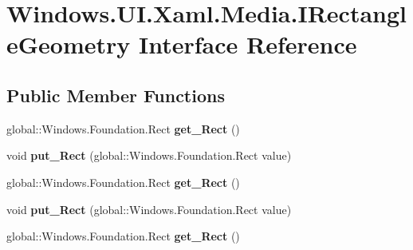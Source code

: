 \hypertarget{interface_windows_1_1_u_i_1_1_xaml_1_1_media_1_1_i_rectangle_geometry}{}\section{Windows.\+U\+I.\+Xaml.\+Media.\+I\+Rectangle\+Geometry Interface Reference}
\label{interface_windows_1_1_u_i_1_1_xaml_1_1_media_1_1_i_rectangle_geometry}
\subsection*{Public Member Functions}
\begin{DoxyCompactItemize}
\item 
\mbox{\label{interface_windows_1_1_u_i_1_1_xaml_1_1_media_1_1_i_rectangle_geometry_a0f7b043b0ee06c706ac2dd2b55e3811c}} 
global\+::\+Windows.\+Foundation.\+Rect {\bfseries get\+\_\+\+Rect} ()
\item 
\mbox{\label{interface_windows_1_1_u_i_1_1_xaml_1_1_media_1_1_i_rectangle_geometry_ad76506b912562159564afd0409fe2572}} 
void {\bfseries put\+\_\+\+Rect} (global\+::\+Windows.\+Foundation.\+Rect value)
\item 
\mbox{\label{interface_windows_1_1_u_i_1_1_xaml_1_1_media_1_1_i_rectangle_geometry_a0f7b043b0ee06c706ac2dd2b55e3811c}} 
global\+::\+Windows.\+Foundation.\+Rect {\bfseries get\+\_\+\+Rect} ()
\item 
\mbox{\label{interface_windows_1_1_u_i_1_1_xaml_1_1_media_1_1_i_rectangle_geometry_ad76506b912562159564afd0409fe2572}} 
void {\bfseries put\+\_\+\+Rect} (global\+::\+Windows.\+Foundation.\+Rect value)
\item 
\mbox{\label{interface_windows_1_1_u_i_1_1_xaml_1_1_media_1_1_i_rectangle_geometry_a0f7b043b0ee06c706ac2dd2b55e3811c}} 
global\+::\+Windows.\+Foundation.\+Rect {\bfseries get\+\_\+\+Rect} ()
\item 

\end{DoxyCompactItemize}
